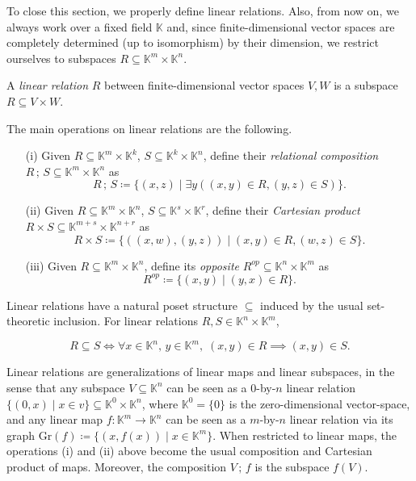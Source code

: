 \documentclass[manyauthors]{fundam}
\def\K{\mathbb{K}}
\begin{document}
To close this section, we properly define linear relations.
Also, from now on, we always work over a fixed field $\K$
and, since finite-dimensional vector spaces are completely determined
(up to isomorphism) by their dimension,
we restrict ourselves to subspaces $R \subseteq \K^m \times \K^n$.

\begin{definition}
\label{def:relation}
A \emph{linear relation} $R$ between finite-dimensional vector spaces $V, W$ is a subspace $R \subseteq V \times W$.
\end{definition}

\begin{definition}
\label{def:relation_operations}
The main operations on linear relations are the following.
\begin{enumerate}
\item[(i)] Given $R \subseteq \K^{m} \times \K^k$, $S \subseteq \K^k \times \K^n$, define their \emph{relational composition} $R \,;\, S \subseteq \K^m \times \K^n$ as
$$R \,;\, S \coloneq \{(x, z) \mid \exists y ((x, y) \in R, (y, z) \in S)\}.$$
\item[(ii)] Given $R \subseteq \K^m \times \K^n$, $S \subseteq \K^s \times \K^r$, define their \emph{Cartesian product}
$R \times S \subseteq \K^{m+s} \times \K^{n+r}$ as
$$R \times S \coloneq \{((x, w), (y, z)) \mid (x, y) \in R, (w, z) \in S\}.$$
\item[(iii)] Given $R \subseteq \K^m \times \K^n$, define its \emph{opposite} $R^{op} \subseteq \K^n \times \K^m$ as
$$R^{op} \coloneq \{(x,y) \mid (y, x) \in R\}.$$
\end{enumerate}
\end{definition}

\begin{definition}
\label{def:relation_poset}
Linear relations have a natural poset structure $\subseteq$ induced by the usual set-theoretic inclusion. For linear relations $R, S \in \K^n \times \K^m$,

\[
  R \subseteq S
  \iff
  \forall x \in \K^n,\, y \in \K^m,\; (x,y) \in R \implies (x, y) \in S.\]

\end{definition}

\noindent Linear relations are generalizations of linear maps and linear subspaces, in the sense that any subspace $V \subseteq \K^n$ can be seen as a $0$-by-$n$ linear relation $\{(0, x) \mid x \in v\} \subseteq \K^{0} \times \K^n$, where $\K^0 = \{0\}$ is the zero-dimensional vector-space, and any linear map $f : \K^m \to \K^n$ can be seen as a $m$-by-$n$ linear relation via its graph $\text{Gr}(f) \coloneq \{(x, f(x)) \mid x \in \K^m\}$. When restricted to linear maps, the operations (i) and (ii) above become the usual composition and Cartesian product of maps. Moreover, the composition $V \,;\, f$ is the subspace $f(V)$.
\end{document}
